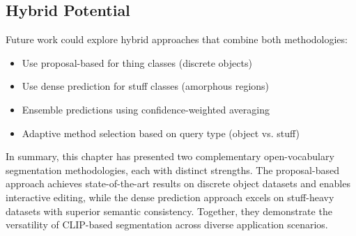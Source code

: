 \subsection{Hybrid Potential}

Future work could explore hybrid approaches that combine both methodologies:
\begin{itemize}
    \item Use proposal-based for thing classes (discrete objects)
    \item Use dense prediction for stuff classes (amorphous regions)
    \item Ensemble predictions using confidence-weighted averaging
    \item Adaptive method selection based on query type (object vs. stuff)
\end{itemize}

In summary, this chapter has presented two complementary open-vocabulary segmentation methodologies, each with distinct strengths. The proposal-based approach achieves state-of-the-art results on discrete object datasets and enables interactive editing, while the dense prediction approach excels on stuff-heavy datasets with superior semantic consistency. Together, they demonstrate the versatility of CLIP-based segmentation across diverse application scenarios.

